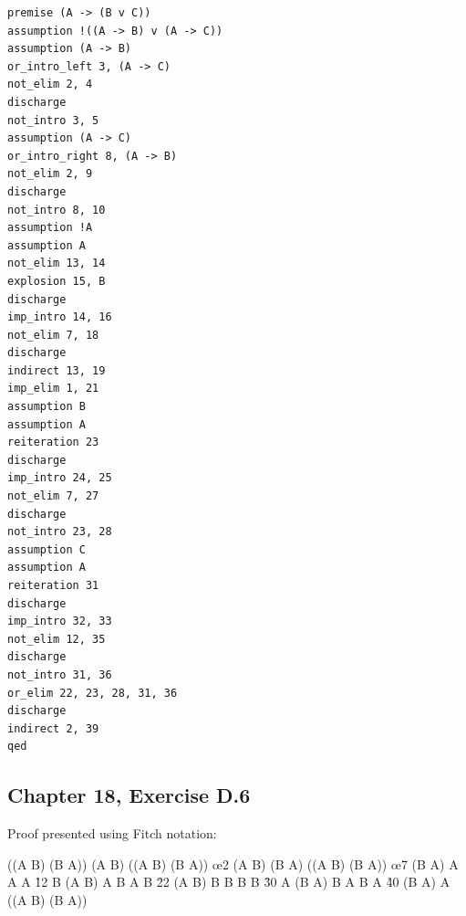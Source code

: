 \documentclass[10pt]{article}
\begin{document}
\begin{lstlisting}[language=Daeducer]
premise (A -> (B v C))
assumption !((A -> B) v (A -> C))
assumption (A -> B)
or_intro_left 3, (A -> C)
not_elim 2, 4
discharge
not_intro 3, 5
assumption (A -> C)
or_intro_right 8, (A -> B)
not_elim 2, 9
discharge
not_intro 8, 10
assumption !A
assumption A
not_elim 13, 14
explosion 15, B
discharge
imp_intro 14, 16
not_elim 7, 18
discharge
indirect 13, 19
imp_elim 1, 21
assumption B
assumption A
reiteration 23
discharge
imp_intro 24, 25
not_elim 7, 27
discharge
not_intro 23, 28
assumption C
assumption A
reiteration 31
discharge
imp_intro 32, 33
not_elim 12, 35
discharge
not_intro 31, 36
or_elim 22, 23, 28, 31, 36
discharge
indirect 2, 39
qed
\end{lstlisting}

\subsection*{Chapter 18, Exercise D.6}

Proof presented using Fitch notation:

\begin{fitchproof}[arrayenv=longtable]
  \open
   {\neg ((A \to B) \lor (B \to A))} 
  \open
   {(A \to B)} 
   {((A \to B) \lor (B \to A))} \oe{2}
   {\bot} 
  \close
   {\neg (A \to B)} 
  \open
   {(B \to A)} 
   {((A \to B) \lor (B \to A))} \oe{7}
   {\bot} 
  \close
   {\neg (B \to A)} 
  \open
   {\neg A} 
  \open
   {A} 
   {\neg A} \r{12}
   {\bot} 
   {B} 
  \close
   {(A \to B)} 
   {\bot} 
  \close
   {A} 
  \open
   {B} 
  \open
   {A} 
   {B} \r{22}
  \close
   {(A \to B)} 
   {\bot} 
  \close
   {\neg B} 
  \open
   {\neg B} 
  \open
   {B} 
   {\neg B} \r{30}
   {\bot} 
   {A} 
  \close
   {(B \to A)} 
   {\bot} 
  \close
   {B} 
  \open
   {A} 
  \open
   {B} 
   {A} \r{40}
  \close
   {(B \to A)} 
   {\bot} 
  \close
   {\neg A} 
   {\bot} 
  \close
   {((A \to B) \lor (B \to A))} 
\end{fitchproof}
\end{document}
